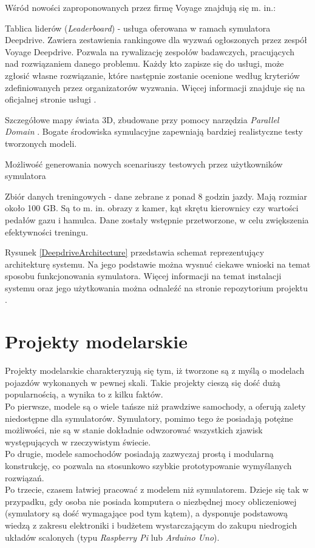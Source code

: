 Wśród nowości zaproponowanych przez firmę Voyage znajdują się m. in.:
\begin{itemize*}
\item Tablica liderów (\textit{Leaderboard}) - usługa oferowana w ramach symulatora Deepdrive. Zawiera zestawienia rankingowe dla wyzwań ogłoszonych przez zespół Voyage Deepdrive. Pozwala na rywalizację zespołów badawczych, pracujących nad rozwiązaniem danego problemu. Każdy kto zapisze się do usługi, może zgłosić własne rozwiązanie, które następnie zostanie ocenione według kryteriów zdefiniowanych przez organizatorów wyzwania. Więcej informacji znajduje się na oficjalnej stronie usługi \cite{deepdrive:leaderboard}.
\item Szczegółowe mapy świata 3D, zbudowane przy pomocy narzędzia \textit{Parallel Domain} \cite{parallelDomain}. Bogate środowiska symulacyjne zapewniają bardziej realistyczne testy tworzonych modeli.
\item Możliwość generowania nowych scenariuszy testowych przez użytkowników symulatora
\item Zbiór danych treningowych - dane zebrane z ponad 8 godzin jazdy. Mają rozmiar około 100 GB. Są to m. in. obrazy z kamer, kąt skrętu kierownicy czy wartości pedałów gazu i hamulca. Dane zostały wstępnie przetworzone, w celu zwiększenia efektywności treningu.
\end{itemize*}

Rysunek \ref{DeepdriveArchitecture} przedstawia schemat reprezentujący architekturę systemu. Na jego podstawie można wysnuć ciekawe wnioski na temat sposobu funkcjonowania symulatora. Więcej informacji na temat instalacji systemu oraz jego użytkowania można odnaleźć na stronie repozytorium projektu \cite{deepdrive:github}.

\section{Projekty modelarskie}
Projekty modelarskie charakteryzują się tym, iż tworzone są z myślą o modelach pojazdów wykonanych w pewnej skali. Takie projekty cieszą się dość dużą popularnością, a wynika to z kilku faktów. \\
Po pierwsze, modele są o wiele tańsze niż prawdziwe samochody, a oferują zalety niedostępne dla symulatorów. Symulatory, pomimo tego że posiadają potężne możliwości, nie są w stanie dokładnie odwzorować wszystkich zjawisk występujących w rzeczywistym świecie. \\
Po drugie, modele samochodów posiadają zazwyczaj prostą i modularną konstrukcję, co pozwala na stosunkowo szybkie prototypowanie wymyślanych rozwiązań. \\
Po trzecie, czasem łatwiej pracować z modelem niż symulatorem. Dzieje się tak w przypadku, gdy osoba nie posiada komputera o niezbędnej mocy obliczeniowej (symulatory są dość wymagające pod tym kątem), a dysponuje podstawową wiedzą z zakresu elektroniki i budżetem wystarczającym do zakupu niedrogich układów scalonych (typu \textit{Raspberry Pi} lub \textit{Arduino Uno}).

